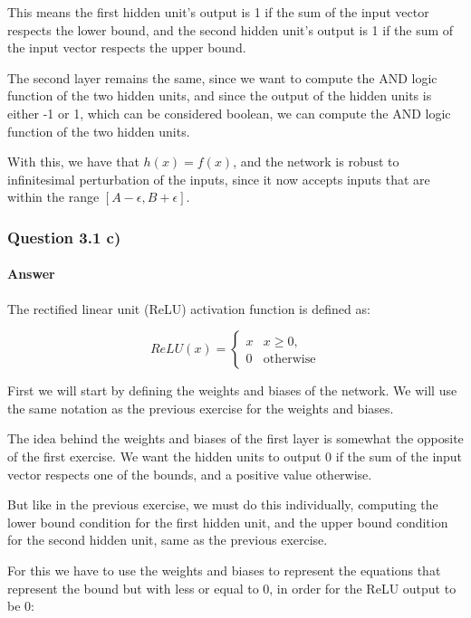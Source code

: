 \documentclass{article}
\begin{document}
This means the first hidden unit's output is 1 if the sum of the input vector respects the lower bound,
and the second hidden unit's output is 1 if the sum of the input vector respects the upper bound.

The second layer remains the same, since we want to compute the AND logic function of the two hidden units, and since the output of
the hidden units is either -1 or 1, which can be considered boolean, we can compute the AND logic function of the two hidden units.

\bigskip

With this, we have that \(h(x) = f(x)\), and the network is robust to infinitesimal perturbation of the inputs, since it now accepts inputs
that are within the range \([A - \epsilon, B + \epsilon]\).

\subsubsection{Question 3.1 c)}

\paragraph{Answer}

The rectified linear unit (ReLU) activation function is defined as:

\[ 
    ReLU(x) = 
    \begin{cases}
        x & x \geq 0, \\
        0 & \text{otherwise}
    \end{cases}
\]

First we will start by defining the weights and biases of the network. We will use the same notation as the previous 
exercise for the weights and biases.

\bigskip

The idea behind the weights and biases of the first layer is somewhat the opposite of the first exercise. We want the hidden units to output 0
if the sum of the input vector respects one of the bounds, and a positive value otherwise.

But like in the previous exercise, we must do this individually, computing the lower bound condition for the first hidden unit, 
and the upper bound condition for the second hidden unit, same as the previous exercise.

\bigskip

For this we have to use the weights and biases to represent the equations that represent the bound but with less or equal to 0, in order for
the ReLU output to be 0:
\end{document}

